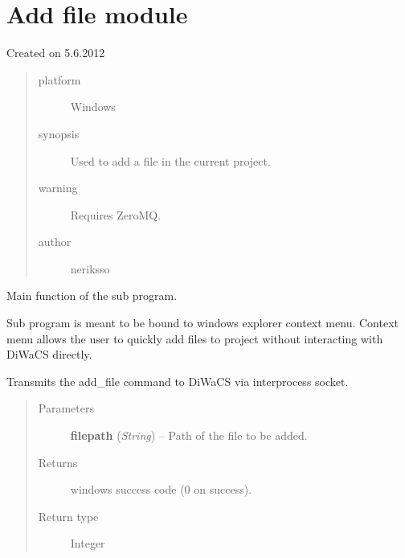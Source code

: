 \documentclass[letterpaper,10pt,english]{sphinxmanual}
\begin{document}
\section{Add file module}
\label{add_file:module-add_file}\label{add_file:add-file-module}\label{add_file::doc}
Created on 5.6.2012
\begin{quote}\begin{description}
\item[{platform}] \leavevmode
Windows

\item[{synopsis}] \leavevmode
Used to add a file in the current project.

\item[{warning}] \leavevmode
Requires ZeroMQ.

\item[{author}] \leavevmode
neriksso

\end{description}\end{quote}

\begin{fulllineitems}
\label{add_file:add_file.main}
Main function of the sub program.

Sub program is meant to be bound to windows explorer context menu.
Context menu allows the user to quickly add files to project without
interacting with DiWaCS directly.

Transmits the add\_file command to DiWaCS via interprocess socket.
\begin{quote}\begin{description}
\item[{Parameters}] \leavevmode
\textbf{filepath} (\emph{String}) -- Path of the file to be added.

\item[{Returns}] \leavevmode
windows success code (0 on success).

\item[{Return type}] \leavevmode
Integer

\end{description}\end{quote}

\end{fulllineitems}
\end{document}
